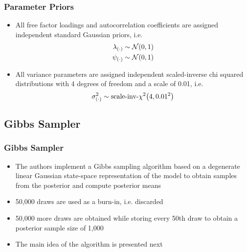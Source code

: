 \documentclass[10pt, compress, notheorems, aspectratio=169]{beamer}
\let\originalleft\left
\let\originalright\right
\renewcommand{\left}{\mathopen{}\mathclose \bgroup \originalleft}
\renewcommand{\right}{\aftergroup \egroup \originalright}
\begin{document}
\begin{frame}
	\frametitle{Parameter Priors}
	\begin{itemize}
		\item All free factor loadings and autocorrelation coefficients are assigned independent standard Gaussian priors, i.e. 
			\begin{align*}
				\lambda_{(\cdot)} &\sim \mathcal{N} \left(0, 1 \right)	\\
				\psi_{(\cdot)} &\sim \mathcal{N} \left(0, 1 \right)	
			\end{align*}

		\item All variance parameters are assigned independent scaled-inverse chi squared distributions with 4 degrees of freedom and a scale of 0.01, i.e.
			\begin{equation*}
				\sigma_{(\cdot)}^2 \sim \text{scale-inv-} \chi^2 \left( 4, 0.01^2 \right)
			\end{equation*}
	\end{itemize}
\end{frame}


\subsection{Gibbs Sampler}
\begin{frame}
	\frametitle{Gibbs Sampler}
	\begin{itemize}
		\item The authors implement a Gibbs sampling algorithm based on a degenerate linear Gaussian state-space representation of the model to obtain samples from the posterior and compute posterior means
		\item 50,000 draws are used as a burn-in, i.e. discarded
		\item 50,000 more draws are obtained while storing every 50th draw to obtain a posterior sample size of 1,000
		\item The main idea of the algorithm is presented next
	\end{itemize}
\end{frame}
\end{document}
